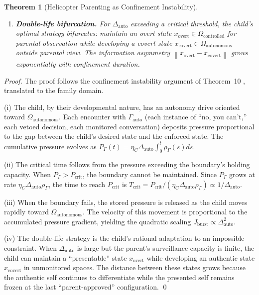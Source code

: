 \documentclass[11pt,a4paper]{article}
\newtheorem{theorem}{Theorem}[section]
\newcommand{\norm}[1]{\left\lVert#1\right\rVert}
\begin{document}
\begin{theorem}[Helicopter Parenting as Confinement Instability]
\begin{enumerate}[label=(\roman*)]
    \item \textbf{Double-life bifurcation.} For $\Delta_{\text{auto}}$ exceeding a critical threshold, the child's optimal strategy bifurcates: maintain an overt state $x_{\text{overt}} \in \Omega_{\text{controlled}}$ for parental observation while developing a covert state $x_{\text{covert}} \in \Omega_{\text{autonomous}}$ outside parental view. The information asymmetry $\norm{x_{\text{overt}} - x_{\text{covert}}}$ grows exponentially with confinement duration.
\end{enumerate}
\end{theorem}

\begin{proof}
The proof follows the confinement instability argument of Theorem~10 \cite{scx_moe_gauge}, translated to the family domain.

(i) The child, by their developmental nature, has an autonomy drive oriented toward $\Omega_{\text{autonomous}}$. Each encounter with $\Gamma_{\text{auto}}$ (each instance of ``no, you can't,'' each vetoed decision, each monitored conversation) deposits pressure proportional to the gap between the child's desired state and the enforced state. The cumulative pressure evolves as $P_{\Gamma}(t) = \eta_C \Delta_{\text{auto}} \int_0^t \rho_{\Gamma}(s) ds$.

(ii) The critical time follows from the pressure exceeding the boundary's holding capacity. When $P_{\Gamma} > P_{\text{crit}}$, the boundary cannot be maintained. Since $P_{\Gamma}$ grows at rate $\eta_C \Delta_{\text{auto}} \rho_{\Gamma}$, the time to reach $P_{\text{crit}}$ is $T_{\text{crit}} = P_{\text{crit}} / (\eta_C \Delta_{\text{auto}} \rho_{\Gamma}) \propto 1/\Delta_{\text{auto}}$.

(iii) When the boundary fails, the stored pressure is released as the child moves rapidly toward $\Omega_{\text{autonomous}}$. The velocity of this movement is proportional to the accumulated pressure gradient, yielding the quadratic scaling $J_{\text{burst}} \propto \Delta_{\text{auto}}^2$.

(iv) The double-life strategy is the child's rational adaptation to an impossible constraint. When $\Delta_{\text{auto}}$ is large but the parent's surveillance capacity is finite, the child can maintain a ``presentable'' state $x_{\text{overt}}$ while developing an authentic state $x_{\text{covert}}$ in unmonitored spaces. The distance between these states grows because the authentic self continues to differentiate while the presented self remains frozen at the last ``parent-approved'' configuration. \qed
\end{proof}
\end{document}
